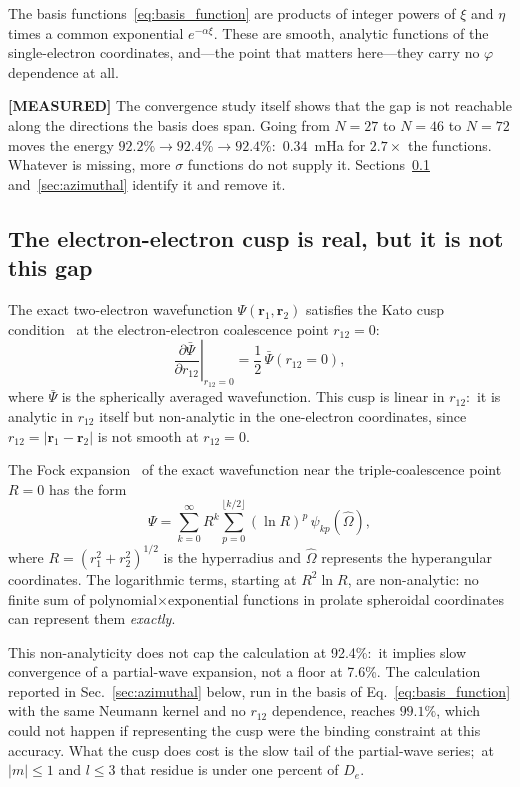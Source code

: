 \documentclass[aps,pra,twocolumn,superscriptaddress,longbibliography]{revtex4-2}
\newcommand{\gvq}[2]{#2}
\begin{document}
The basis functions~\eqref{eq:basis_function} are products
of integer powers of $\xi$ and $\eta$ times a common
exponential $e^{-\alpha\xi}$.  These are smooth, analytic
functions of the single-electron coordinates, and---the point that
matters here---they carry no $\varphi$ dependence at all.

\textbf{[MEASURED]} The convergence study itself shows that the gap
is not reachable along the directions the basis does span.  Going
from $N = 27$ to $N = 46$ to $N = 72$ moves the energy
$92.2\% \to 92.4\% \to 92.4\%$:\ $\gvq{p12_sigma_growth_mha}{0.34}$~mHa for $2.7\times$ the
functions.  Whatever is missing, more $\sigma$ functions do not
supply it.  Sections~\ref{sec:azimuthal_diagnosis}
and~\ref{sec:azimuthal} identify it and remove it.

\subsection{The electron-electron cusp is real, but it is not this
gap}
\label{sec:azimuthal_diagnosis}

The exact two-electron wavefunction $\Psi(\mathbf{r}_1,
\mathbf{r}_2)$ satisfies the Kato cusp condition~\cite{Kato1957}
at the electron-electron coalescence point $r_{12} = 0$:
\begin{equation}
  \left.\frac{\partial\bar{\Psi}}{\partial r_{12}}\right|_{r_{12}=0}
  = \frac{1}{2}\,\bar{\Psi}(r_{12}=0),
  \label{eq:kato}
\end{equation}
where $\bar{\Psi}$ is the spherically averaged wavefunction.
This cusp is linear in $r_{12}$:\ it is analytic in $r_{12}$ itself
but non-analytic in the one-electron coordinates, since
$r_{12} = |\mathbf{r}_1 - \mathbf{r}_2|$ is not smooth at $r_{12} = 0$.

The Fock expansion~\cite{Fock1954, Morgan1986} of the exact
wavefunction near the triple-coalescence point $R = 0$ has the form
\begin{equation}
  \Psi = \sum_{k=0}^\infty R^{k}\sum_{p=0}^{\lfloor k/2\rfloor}
    (\ln R)^p\,\psi_{kp}(\hat{\Omega}),
  \label{eq:fock_expansion}
\end{equation}
where $R = (r_1^2 + r_2^2)^{1/2}$ is the hyperradius and
$\hat{\Omega}$ represents the hyperangular coordinates.  The
logarithmic terms, starting at $R^2\ln R$, are non-analytic:
no finite sum of polynomial$\times$exponential functions in
prolate spheroidal coordinates can represent them \emph{exactly}.

This non-analyticity does not cap the calculation at 92.4\%:\ it
implies slow convergence of a partial-wave expansion, not a floor at
7.6\%.  The calculation reported in
Sec.~\ref{sec:azimuthal} below, run in the basis of
Eq.~\eqref{eq:basis_function} with the same Neumann kernel and
no $r_{12}$ dependence, reaches $99.1\%$, which could not happen if representing the cusp were the binding constraint at this
accuracy.  What the cusp does cost is the slow tail of the
partial-wave series;\ at $|m| \le 1$ and $l \le 3$ that residue is
under one percent of $D_e$.
\end{document}
